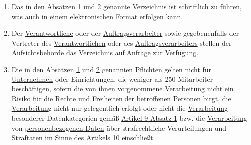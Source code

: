 \begin{enumerate}
\begin{enumerate}
  \end{enumerate}

  \item Das in den Absätzen \hyperref[itm:30-1]{1} und \hyperref[itm:30-2]{2} genannte Verzeichnis ist schriftlich zu
   führen, was auch in einem elektronischen Format erfolgen kann.
  \label{itm:30-3}

  \item Der \hyperref[itm:04-7]{Verantwortliche} oder der \hyperref[itm:04-8]{Auftragsverarbeiter} sowie gegebenenfalls der Vertreter des \hyperref[itm:04-7]{Verantwortlichen} oder
   des \hyperref[itm:04-8]{Auftragsverarbeiters} stellen der \hyperref[itm:04-21]{Aufsichtsbehörde} das Verzeichnis auf Anfrage zur Verfügung.
  \label{itm:30-4}

  \item Die in den Absätzen \hyperref[itm:30-1]{1} und \hyperref[itm:30-2]{2} genannten Pflichten gelten nicht für
   \hyperref[itm:04-18]{Unternehmen} oder Einrichtungen, die weniger als 250 Mitarbeiter beschäftigen, sofern die von ihnen vorgenommene
   \hyperref[itm:04-2]{Verarbeitung} nicht ein Risiko für die Rechte und Freiheiten der \hyperref[itm:04-1]{betroffenen Personen} birgt, die \hyperref[itm:04-2]{Verarbeitung} nicht
   nur gelegentlich erfolgt oder nicht die \hyperref[itm:04-2]{Verarbeitung} besonderer Datenkategorien gemäß \hyperref[itm:09-1]{Artikel 9
   Absatz 1} bzw. die  \hyperref[itm:04-2]{Verarbeitung} von \hyperref[itm:04-1]{personenbezogenen Daten} über strafrechtliche Verurteilungen und Straftaten im
   Sinne des \hyperref[ch:10]{Artikels 10} einschließt.
  \label{itm:30-5}

\end{enumerate}


